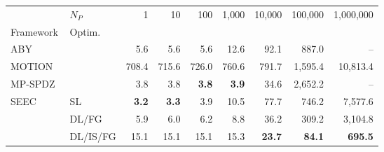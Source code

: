 \begin{tabular}{llrrrrrrr}
\toprule
 & $N_P$ & 1 & 10 & 100 & 1,000 & 10,000 & 100,000 & 1,000,000 \\
Framework & Optim. &  &  &  &  &  &  &  \\
\midrule
ABY~\cite{DSZ15} &  & 5.6 & 5.6 & 5.6 & 12.6 & 92.1 & 887.0 & -- \\
\cline{1-9}
MOTION~\cite{BDST22} &  & 708.4 & 715.6 & 726.0 & 760.6 & 791.7 & 1,595.4 & 10,813.4 \\
\cline{1-9}
MP-SPDZ~\cite{CCS:Keller20} &  & 3.8 & 3.8 & \bfseries 3.8 & \bfseries 3.9 & 34.6 & 2,652.2 & -- \\
\cline{1-9}
\multirow[c]{3}{*}{SEEC} & SL & \bfseries 3.2 & \bfseries 3.3 & 3.9 & 10.5 & 77.7 & 746.2 & 7,577.6 \\
 & DL/FG & 5.9 & 6.0 & 6.2 & 8.8 & 36.2 & 309.2 & 3,104.8 \\
 & DL/IS/FG & 15.1 & 15.1 & 15.1 & 15.3 & \bfseries 23.7 & \bfseries 84.1 & \bfseries 695.5 \\
\bottomrule
\end{tabular}

